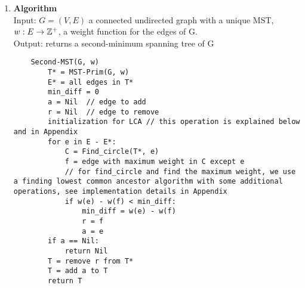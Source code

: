 \documentclass[11pt]{article}
\begin{document}
\begin{enumerate}
\item \textbf{Algorithm} \\
    Input: $G = (V,E)$ a connected undirected graph with a unique MST, $w: E\rightarrow \mathbb Z^+$, a weight function for the edges of G.\\
    Output: returns a second-minimum spanning tree of G \\
    \begin{lstlisting}
    Second-MST(G, w)
        T* = MST-Prim(G, w)
        E* = all edges in T*
        min_diff = 0
        a = Nil  // edge to add
        r = Nil  // edge to remove
        initialization for LCA // this operation is explained below and in Appendix
        for e in E - E*:
            C = Find_circle(T*, e)
            f = edge with maximum weight in C except e 
            // for find_circle and find the maximum weight, we use a finding lowest common ancestor algorithm with some additional operations, see implementation details in Appendix 
            if w(e) - w(f) < min_diff:
                min_diff = w(e) - w(f)
                r = f
                a = e
        if a == Nil:
            return Nil
        T = remove r from T*
        T = add a to T
        return T
    \end{lstlisting}
    


\end{enumerate}
\end{document}
